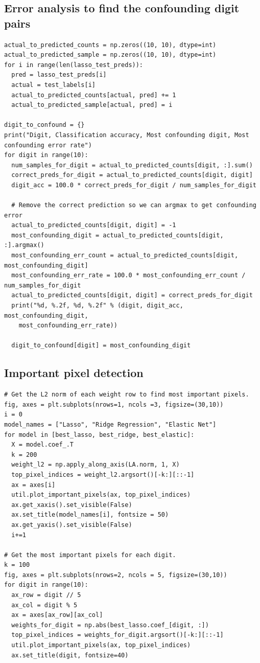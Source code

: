 \documentclass[letterpaper, 10 pt, conference]{ieeeconf}  %
\begin{document}
\subsection*{Error analysis to find the confounding digit pairs}
\begin{verbatim}
actual_to_predicted_counts = np.zeros((10, 10), dtype=int)
actual_to_predicted_sample = np.zeros((10, 10), dtype=int)
for i in range(len(lasso_test_preds)):
  pred = lasso_test_preds[i]
  actual = test_labels[i]
  actual_to_predicted_counts[actual, pred] += 1
  actual_to_predicted_sample[actual, pred] = i

digit_to_confound = {}
print("Digit, Classification accuracy, Most confounding digit, Most confounding error rate")
for digit in range(10):
  num_samples_for_digit = actual_to_predicted_counts[digit, :].sum()
  correct_preds_for_digit = actual_to_predicted_counts[digit, digit]
  digit_acc = 100.0 * correct_preds_for_digit / num_samples_for_digit 
  
  # Remove the correct prediction so we can argmax to get confounding error 
  actual_to_predicted_counts[digit, digit] = -1
  most_confounding_digit = actual_to_predicted_counts[digit, :].argmax()
  most_confounding_err_count = actual_to_predicted_counts[digit, most_confounding_digit]
  most_confounding_err_rate = 100.0 * most_confounding_err_count / num_samples_for_digit
  actual_to_predicted_counts[digit, digit] = correct_preds_for_digit
  print("%d, %.2f, %d, %.2f" % (digit, digit_acc, most_confounding_digit,
    most_confounding_err_rate))
  
  digit_to_confound[digit] = most_confounding_digit
\end{verbatim}

\subsection*{Important pixel detection}
\begin{verbatim}
# Get the L2 norm of each weight row to find most important pixels.
fig, axes = plt.subplots(nrows=1, ncols =3, figsize=(30,10))
i = 0
model_names = ["Lasso", "Ridge Regression", "Elastic Net"]
for model in [best_lasso, best_ridge, best_elastic]:
  X = model.coef_.T
  k = 200
  weight_l2 = np.apply_along_axis(LA.norm, 1, X)
  top_pixel_indices = weight_l2.argsort()[-k:][::-1]
  ax = axes[i]
  util.plot_important_pixels(ax, top_pixel_indices)
  ax.get_xaxis().set_visible(False)
  ax.set_title(model_names[i], fontsize = 50)
  ax.get_yaxis().set_visible(False)
  i+=1

# Get the most important pixels for each digit.
k = 100
fig, axes = plt.subplots(nrows=2, ncols = 5, figsize=(30,10))
for digit in range(10):
  ax_row = digit // 5
  ax_col = digit % 5
  ax = axes[ax_row][ax_col]
  weights_for_digit = np.abs(best_lasso.coef_[digit, :])
  top_pixel_indices = weights_for_digit.argsort()[-k:][::-1]
  util.plot_important_pixels(ax, top_pixel_indices)
  ax.set_title(digit, fontsize=40)
\end{verbatim}
\end{document}
